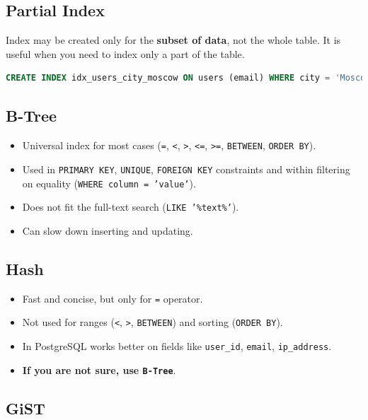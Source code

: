 \documentclass{article}
\newcommand{\code}[1]{\colorbox{light-gray}{\texttt{#1}}}
\begin{document}
\subsection{Partial Index}
\noindent

Index may be created only for the \textbf{subset of data}, not the whole table. It is useful when you need to index only a part of the table.

\begin{lstlisting}[language=SQL, caption={Partial index example}]
  CREATE INDEX idx_users_city_moscow ON users (email) WHERE city = 'Moscow';
\end{lstlisting}

\subsection{B-Tree}
\noindent

\begin{itemize}
  \item Universal index for most cases (\code{=}, \code{<}, \code{>}, \code{<=}, \code{>=}, \code{BETWEEN}, \code{ORDER BY}).
  \item Used in \code{PRIMARY KEY}, \code{UNIQUE}, \code{FOREIGN KEY} constraints and within filtering on equality (\code{WHERE column = 'value'}).
  \item Does not fit the full-text search (\code{LIKE '\%text\%'}).
  \item Can slow down inserting and updating.
\end{itemize}

\subsection{Hash}
\noindent

\begin{itemize}
  \item Fast and concise, but only for \code{=} operator.
  \item Not used for ranges (\code{<}, \code{>}, \code{BETWEEN}) and sorting (\code{ORDER BY}).
  \item In PostgreSQL works better on fields like \code{user\_id}, \code{email}, \code{ip\_address}.
  \item \textbf{If you are not sure, use \code{B-Tree}}. 
\end{itemize}

\subsection{GiST}
\noindent 
\end{document}
